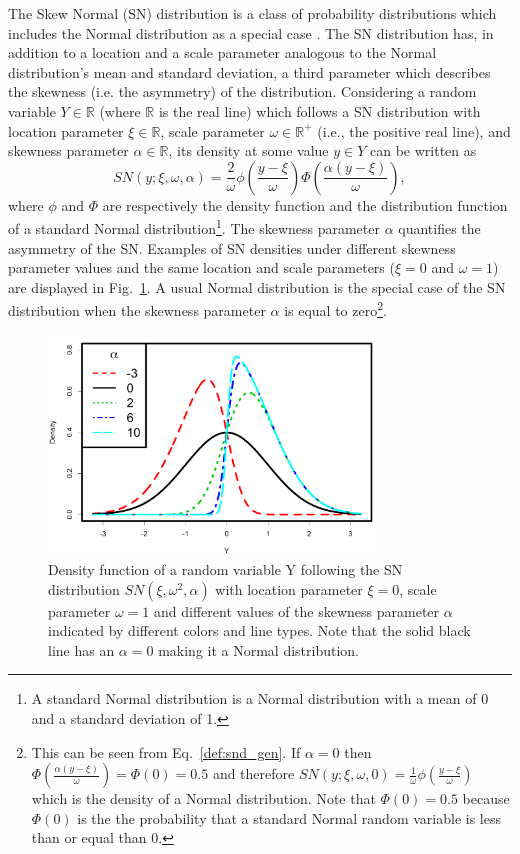 \documentclass{aa}
\begin{document}
The Skew Normal (SN) distribution is a class of probability distributions which includes the Normal distribution as a special case \citep{Azzalini1985}. The SN distribution has, in addition to a location and a scale parameter analogous to the Normal distribution's mean and standard deviation, a third parameter which describes the skewness (i.e. the asymmetry) of the distribution. Considering a random variable $Y\in \mathbb R$ (where $\mathbb R$ is the real line) which follows a SN distribution with location parameter $\xi \in \mathbb R$, scale parameter $\omega \in \mathbb R^{+}$ (i.e., the positive real line), and skewness parameter $\alpha \in \mathbb R$, its density at some value $y\in Y$ can be written as 
\begin{equation} \label{def:snd_gen}
SN(y;\xi, \omega, \alpha) = \frac{2}{\omega} \phi\left(\frac{y-\xi}{\omega}\right) \Phi\left(\frac{\alpha(y-\xi)}{\omega}\right),
\end{equation}
where $\phi$ and $\Phi$ are respectively the density function and the distribution function of a standard Normal distribution\footnote{A standard Normal distribution is a Normal distribution with a mean of 0 and a standard deviation of 1.}.
The skewness parameter $\alpha$ quantifies the asymmetry of the SN. 
Examples of SN densities under different skewness parameter values and the same location and scale parameters ($\xi = 0$ and $\omega = 1$) are displayed in Fig.~\ref{fig:SN.plot}.  A usual Normal distribution is the special case of the SN distribution when the skewness parameter $\alpha$ is equal to zero\footnote{This can be seen from Eq.~\ref{def:snd_gen}. If $\alpha = 0$ then $\Phi\left(\frac{\alpha(y-\xi)}{\omega}\right) = \Phi(0) = 0.5$ and therefore $SN(y;\xi, \omega, 0) = \frac{1}{\omega} \phi\left(\frac{y-\xi}{\omega}\right)$ which is the density of a Normal distribution. Note that $\Phi(0) = 0.5$ because $\Phi(0)$ is the the probability that a standard Normal random variable is less than or equal than 0.}.
%
\begin{figure}[t]
\begin{center}
\includegraphics[height = 2.3in]{Skew_Normal_densities_jjck.pdf} 
   \caption{Density function of a random variable Y following the SN distribution $SN(\xi, \omega^{2}, \alpha)$ with location parameter $\xi = 0$, scale parameter $\omega = 1$ and different values of the skewness parameter $\alpha$ indicated by different colors and line types. Note that the solid black line has an $\alpha = 0$ making it a Normal distribution.}
   \label{fig:SN.plot}
\end{center}
\end{figure}
\end{document}

